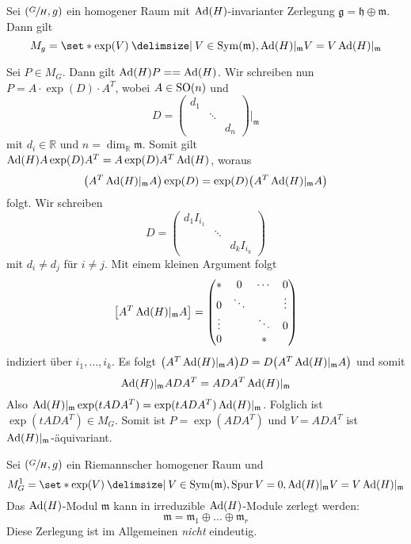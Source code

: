 
\begin{satz}[label=satz:3210]
	Sei $\enbrace*{\sfrac{G}{H},g}$ ein homogener Raum mit $\Ad(H)$-invarianter Zerlegung $\mathfrak{g} = \mathfrak{h} \oplus \mathfrak{m}$.
	Dann gilt
	\[
		M_g = \set*{\exp(V) \given V \in \Sym(\mathfrak{m}), \Ad(H)|_\mathfrak{m} V = V \Ad(H)|_{\mathfrak{m}}}
	\]
\end{satz}
\begin{beweis}
	Sei $P \in M_G$.
	Dann gilt $\Ad(H)P = = \Ad(H)$.
	Wir schreiben nun $P = A \cdot \exp(D) \cdot A^T$, wobei $A \in \SO(n)$ und
	\[
		D = \begin{pmatrix}
			d_1 & & \\
			& \ddots & \\
			& & d_n
		\end{pmatrix} \Big|_{\mathfrak{m}}
	\]
	mit $d_i \in \mathbb{R}$ und $n = \dim_\mathbb{R} \mathfrak{m}$.
	Somit gilt $\Ad(H) A \exp(D) A^T = A \exp(D)A^T \Ad(H)$, woraus
	\[
		\enbrace*{A^T \Ad(H)|_\mathfrak{m} A} \exp(D) = \exp(D) \enbrace*{A^T \Ad(H)|_\mathfrak{m} A}
	\]
	folgt. Wir schreiben 
	\[
		D = \begin{pmatrix}
			d_1 I_{i_1} & & \\
			& \ddots & \\
			& & d_k I_{i_k}
		\end{pmatrix}
	\]
	mit $d_i \neq d_j$ für $i \neq j$.
	Mit einem kleinen Argument folgt
	\[
		\benbrace*{A^T \Ad(H)|_\mathfrak{m} A} = \begin{pmatrix}
			* & 0 & \cdots & 0 \\
			0 & \ddots & & \vdots \\
			\vdots & & \ddots & 0 \\
			0 & & *
		\end{pmatrix}
	\]
	indiziert über $i_1, \ldots , i_k$.
	Es folgt $\enbrace*{A^T \Ad(H)|_\mathfrak{m} A} D = D \enbrace*{A^T \Ad(H)|_\mathfrak{m} A}$ und somit
	\[
		\Ad(H)|_\mathfrak{m} A D A^T = A DA^T \Ad(H)|_\mathfrak{m}
	\]
	Also $\Ad(H)|_\mathfrak{m} \exp(t ADA^T) = \exp(t A D A^T) \Ad(H)|_{\mathfrak{m}}$.
	Folglich ist $\exp(t A DA^T) \in  M_G$.
	Somit ist $P = \exp(A D A^T)$ und $V= A DA^T$ ist $\Ad(H)|_\mathfrak{m}$-äquivariant.
\end{beweis}

\begin{korollar}[label=korr:3211]
	Sei $\enbrace*{\sfrac{G}{H}, g}$ ein Riemannscher homogener Raum und 
	\[
		M_G^1 = \set*{\exp(V) \given V \in \Sym(\mathfrak{m}), \operatorname{Spur} V =0, \Ad(H)|_\mathfrak{m} V = V \Ad(H)|_\mathfrak{m}}
	\]
	Das $\Ad(H)$-Modul $\mathfrak{m}$ kann in irreduzible $\Ad(H)$-Module zerlegt werden:
	\[
		\mathfrak{m} = \mathfrak{m}_1 \oplus \ldots \oplus \mathfrak{m}_r
	\]
	Diese Zerlegung ist im Allgemeinen \emph{nicht} eindeutig.
\end{korollar}

